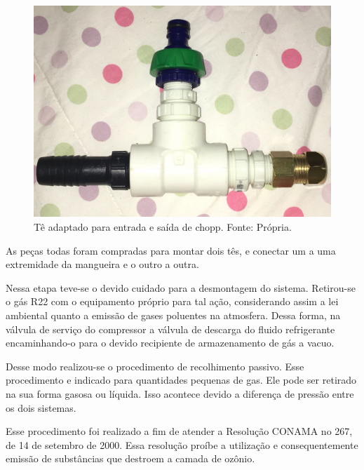                 \begin{figure}[!htb]
                    \centering
                    \includegraphics[scale= 0.3]{figuras/entrada-saida-chopp.png}
                    \caption{Tê adaptado para entrada e saída de chopp. Fonte: Própria.}
                    \label{entrada-saida-chopp}
                \end{figure}

                As peças todas foram compradas para montar dois tês, e conectar um a uma
                extremidade da mangueira e o outro a outra.

                Nessa etapa teve-se o devido cuidado para a desmontagem do sistema.
                Retirou-se o gás R22 com o equipamento próprio para tal ação, considerando assim a
                lei ambiental quanto a emissão de gases poluentes na atmosfera. Dessa forma, na
                válvula de serviço do compressor a válvula de descarga do fluido refrigerante
                encaminhando-o para o devido recipiente de armazenamento de gás a vacuo.
    
                Desse modo realizou-se o procedimento de recolhimento passivo. Esse
                procedimento e indicado para quantidades pequenas de gas. Ele pode ser retirado na
                sua forma gasosa ou líquida. Isso acontece devido a diferença de pressão entre os dois
                sistemas.

                Esse procedimento foi realizado a fim de atender a Resolução CONAMA no
                267, de 14 de setembro de 2000. Essa resolução proíbe a utilização e
                consequentemente emissão de substâncias que destroem a camada de ozônio.


